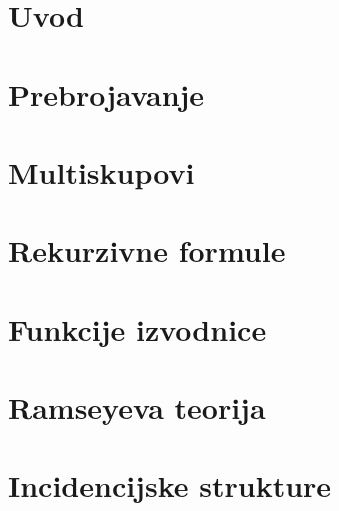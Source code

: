 \maketitle
\newpage
{}

\clearpage
\cleardoublepage
{}

\tableofcontents

\clearpage
{}
\setcounter{page}{1}

\part{Uvod}



\part{Prebrojavanje}









\part{Multiskupovi}





\part{Rekurzivne formule}


\part{Funkcije izvodnice}


\part{Ramseyeva teorija}


\part{Incidencijske strukture}

